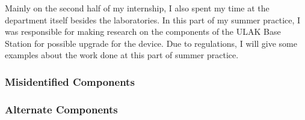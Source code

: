 	Mainly on the second half of my internship, I also spent my time at the department itself besides the laboratories. In this part of my summer practice, I was responsible for making research on the components of the ULAK Base Station for possible upgrade for the device. Due to regulations, I will give some examples about the work done at this part of summer practice. 


\subsubsection{Misidentified Components}
\- \indent
	
	
\subsubsection{Alternate Components}
\- \indent
	


\- \vfill

								
	
 
%      
	
	


